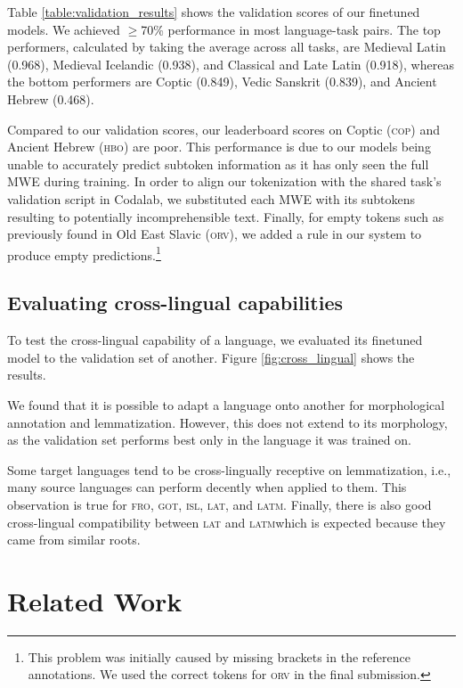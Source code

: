 \documentclass[11pt]{article}
\begin{document}


Table \ref{table:validation_results} shows the validation scores of our finetuned models.
We achieved $\geq$70\% performance in most language-task pairs.
The top performers, calculated by taking the average across all tasks, are Medieval Latin (0.968), Medieval Icelandic (0.938), and Classical and Late Latin (0.918),
whereas the bottom performers are Coptic (0.849), Vedic Sanskrit (0.839), and Ancient Hebrew (0.468).

Compared to our validation scores, our leaderboard scores on Coptic (\textsc{cop}) and Ancient Hebrew (\textsc{hbo}) are poor.
This performance is due to our models being unable to accurately predict subtoken information as it has only seen the full MWE during training.
In order to align our tokenization with the shared task's validation script in Codalab, we substituted each MWE with its subtokens resulting to potentially incomprehensible text.
Finally, for empty tokens such as previously found in Old East Slavic (\textsc{orv}), we added a rule in our system to produce empty predictions.\footnote[1]{This problem was initially caused by missing brackets in the reference annotations. We used the correct tokens for \textsc{orv} in the final submission.}

\subsection{Evaluating cross-lingual capabilities}
\label{sec:results_crosslingual}

To test the cross-lingual capability of a language, we evaluated its finetuned model to the validation set of another.
Figure \ref{fig:cross_lingual} shows the results.

We found that it is possible to adapt a language onto another for morphological annotation and lemmatization.
However, this does not extend to its morphology, as the validation set performs best only in the language it was trained on.

Some target languages tend to be cross-lingually receptive on lemmatization, i.e., many source languages can perform decently when applied to them.
This observation is true for \textsc{fro}, \textsc{got}, \textsc{isl}, \textsc{lat}, and \textsc{latm}.
Finally, there is also good cross-lingual compatibility between \textsc{lat} and \textsc{latm}\textemdash which is expected because they came from similar roots.

\section{Related Work}
\end{document}
